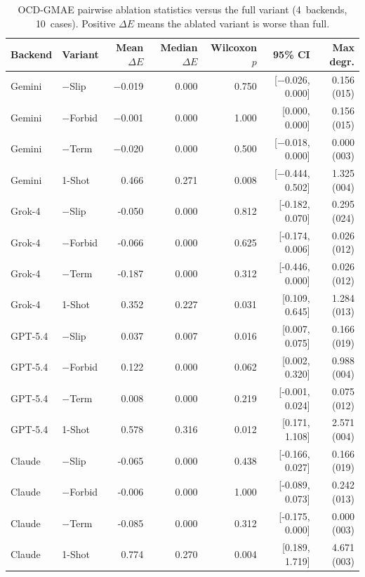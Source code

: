 \vspace{1em}

\begin{table}[h]
\centering
\small
\caption{OCD-GMAE pairwise ablation statistics versus the full variant (4~backends, 10~cases). Positive $\Delta E$ means the ablated variant is worse than full.}
\label{tab:si4-ocd-ablation-statistics}
\begin{tabular}{llrrrrr}
\toprule
Backend & Variant & Mean $\Delta E$ & Median $\Delta E$ & Wilcoxon $p$ & 95\% CI & Max degr. \\
\midrule
Gemini & $-$Slip & $-$0.019 & 0.000 & 0.750 & [$-$0.026, 0.000] & 0.156 (015) \\
Gemini & $-$Forbid & $-$0.001 & 0.000 & 1.000 & [0.000, 0.000] & 0.156 (015) \\
Gemini & $-$Term & $-$0.020 & 0.000 & 0.500 & [$-$0.018, 0.000] & 0.000 (003) \\
Gemini & 1-Shot & 0.466 & 0.271 & 0.008 & [$-$0.444, 0.502] & 1.325 (004) \\
Grok-4 & $-$Slip & -0.050 & 0.000 & 0.812 & [-0.182, 0.070] & 0.295 (024) \\
Grok-4 & $-$Forbid & -0.066 & 0.000 & 0.625 & [-0.174, 0.006] & 0.026 (012) \\
Grok-4 & $-$Term & -0.187 & 0.000 & 0.312 & [-0.446, 0.000] & 0.026 (012) \\
Grok-4 & 1-Shot & 0.352 & 0.227 & 0.031 & [0.109, 0.645] & 1.284 (013) \\
GPT-5.4 & $-$Slip & 0.037 & 0.007 & 0.016 & [0.007, 0.075] & 0.166 (019) \\
GPT-5.4 & $-$Forbid & 0.122 & 0.000 & 0.062 & [0.002, 0.320] & 0.988 (004) \\
GPT-5.4 & $-$Term & 0.008 & 0.000 & 0.219 & [-0.001, 0.024] & 0.075 (012) \\
GPT-5.4 & 1-Shot & 0.578 & 0.316 & 0.012 & [0.171, 1.108] & 2.571 (004) \\
Claude & $-$Slip & -0.065 & 0.000 & 0.438 & [-0.166, 0.027] & 0.166 (019) \\
Claude & $-$Forbid & -0.006 & 0.000 & 1.000 & [-0.089, 0.073] & 0.242 (013) \\
Claude & $-$Term & -0.085 & 0.000 & 0.312 & [-0.175, 0.000] & 0.000 (003) \\
Claude & 1-Shot & 0.774 & 0.270 & 0.004 & [0.189, 1.719] & 4.671 (003) \\
\bottomrule
\end{tabular}
\end{table}

